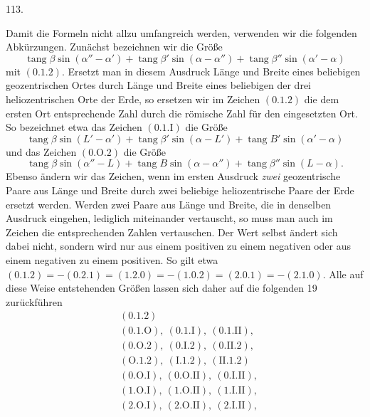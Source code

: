 \par{}\medskip
{}
\begin{center}113.\end{center}
Damit die Formeln nicht allzu umfangreich werden, verwenden wir die folgenden Abkürzungen. Zunächst bezeichnen wir die Größe
\[
\operatorname{tang}\beta\sin(\alpha''-\alpha')+\operatorname{tang}\beta'\sin(\alpha-\alpha'')+\operatorname{tang}\beta''\sin(\alpha'-\alpha)
\]
mit $(0.1.2)$. Ersetzt man in diesem Ausdruck Länge und Breite eines beliebigen geozentrischen Ortes durch Länge und Breite eines beliebigen der drei heliozentrischen Orte der Erde, so ersetzen wir im Zeichen $(0.1.2)$ die dem ersten Ort entsprechende Zahl durch die römische Zahl für den eingesetzten Ort. So bezeichnet etwa das Zeichen $(0.1.\mathrm{I})$ die Größe
\[
\operatorname{tang}\beta\sin(L'-\alpha')+\operatorname{tang}\beta'\sin(\alpha-L')+\operatorname{tang}B'\sin(\alpha'-\alpha)
\]
und das Zeichen $(0.\mathrm{O}.2)$ die Größe
\[
\operatorname{tang}\beta\sin(\alpha''-L)+\operatorname{tang}B\sin(\alpha-\alpha'')+\operatorname{tang}\beta''\sin(L-\alpha).
\]
Ebenso ändern wir das Zeichen, wenn im ersten Ausdruck \emph{zwei} geozentrische Paare aus Länge und Breite durch zwei beliebige heliozentrische Paare der Erde ersetzt werden. Werden zwei Paare aus Länge und Breite, die in denselben Ausdruck eingehen, lediglich miteinander vertauscht, so muss man auch im Zeichen die entsprechenden Zahlen vertauschen. Der Wert selbst ändert sich dabei nicht, sondern wird nur aus einem positiven zu einem negativen oder aus einem negativen zu einem positiven. So gilt etwa $(0.1.2)=-(0.2.1)=(1.2.0)=-(1.0.2)=(2.0.1)=-(2.1.0)$. Alle auf diese Weise entstehenden Größen lassen sich daher auf die folgenden 19 zurückführen
\[
\begin{aligned}
&(0.1.2)\\
&(0.1.\mathrm{O}),\ (0.1.\mathrm{I}),\ (0.1.\mathrm{II}),\\
&(0.\mathrm{O}.2),\ (0.\mathrm{I}.2),\ (0.\mathrm{II}.2),\\
&(\mathrm{O}.1.2),\ (\mathrm{I}.1.2),\ (\mathrm{II}.1.2)\\
&(0.\mathrm{O}.\mathrm{I}),\ (0.\mathrm{O}.\mathrm{II}),\ (0.\mathrm{I}.\mathrm{II}),\\
&(1.\mathrm{O}.\mathrm{I}),\ (1.\mathrm{O}.\mathrm{II}),\ (1.\mathrm{I}.\mathrm{II}),\\
&(2.\mathrm{O}.\mathrm{I}),\ (2.\mathrm{O}.\mathrm{II}),\ (2.\mathrm{I}.\mathrm{II}),
\end{aligned}
\]
